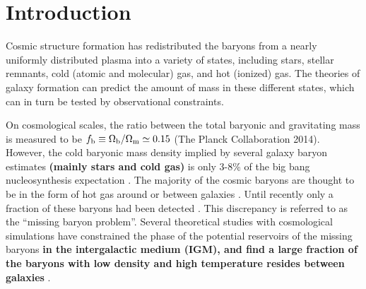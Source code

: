 \documentclass[useAMS,usenatbib]{mn2e}
\begin{document}
\setcounter{footnote}{1}


\section{Introduction}
\label{sec:intro}
Cosmic structure formation has redistributed the baryons from  a
nearly uniformly distributed plasma into a variety of states,
including stars, stellar remnants, cold (atomic and molecular) gas,
and hot (ionized) gas. The theories of galaxy formation can predict
the amount of mass in these different states, which can in turn be
tested by observational constraints.  

On cosmological scales, the ratio between the total baryonic and
gravitating mass is measured to be $f_{\rm b}\equiv \Omega_{\rm
  b}/\Omega_{\rm m}\simeq 0.15$ (The Planck Collaboration 2014).
However, the cold baryonic mass density implied by several galaxy
baryon estimates {\bf (mainly stars and cold gas)} is only 3-8\% of
the big bang nucleosynthesis expectation \citep{Persic92, Fukugita98,
  Bell03, McGaugh10}.  The majority of the cosmic baryons are thought
to be in the form of hot gas around or between galaxies
\citep{Cen09}. Until recently only a fraction of these baryons had
been detected \citep{Bregman07, Shull12}.  This discrepancy is
referred to as the ``missing baryon problem''.  Several theoretical
studies with cosmological simulations have constrained the phase of
the potential reservoirs of the missing baryons {\bf in the
  intergalactic medium (IGM), and find a large fraction of the baryons
  with low density and high temperature resides between galaxies}
\citep{Yoshida05, He05, Dave10, Zhu11, Haider16}.
\end{document}
